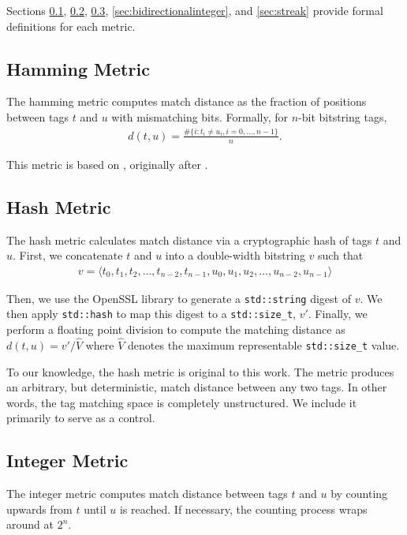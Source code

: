Sections \ref{sec:hamming}, \ref{sec:hash}, \ref{sec:integer}, \ref{sec:bidirectionalinteger}, and \ref{sec:streak} provide formal definitions for each metric.

\subsection{Hamming Metric} \label{sec:hamming}

The hamming metric computes match distance as the fraction of positions between tags $t$ and $u$ with mismatching bits.
Formally, for $n$-bit bitstring tags,
\begin{align*}
d(t, u)
= \frac{
  \#\{ i : t_i \neq u_i, i=0, \dots ,n-1\}
}{
  n
}.
\end{align*}

This metric is based on \cite{lalejini2019else}, originally after \cite{hamming1950error}.

\subsection{Hash Metric} \label{sec:hash}

The hash metric calculates match distance via a cryptographic hash of tags $t$ and $u$.
First, we concatenate $t$ and $u$ into a double-width bitstring $v$ such that
\begin{align*}
v = \langle t_0, t_1, t_2, \dots, t_{n-2}, t_{n-1}, u_0, u_1, u_2, \dots, u_{n-2}, u_{n-1} \rangle
\end{align*}

Then, we use the OpenSSL library to generate a \texttt{std::string} digest of $v$.
We then apply \texttt{std::hash} to map this digest to a \texttt{std::size\_t}, $v'$.
Finally, we perform a floating point division to compute the matching distance as $d(t, u) = v' / \hat{V}$ where $\hat{V}$  denotes the maximum representable \texttt{std::size\_t} value.

To our knowledge, the hash metric is original to this work.
The metric produces an arbitrary, but deterministic, match distance between any two tags.
In other words, the tag matching space is completely unstructured.
We include it primarily to serve as a control.

\subsection{Integer Metric} \label{sec:integer}

The integer metric computes match distance between tags $t$ and $u$ by counting upwards from $t$ until $u$ is reached.
If necessary, the counting process wraps around at $2^n$.

